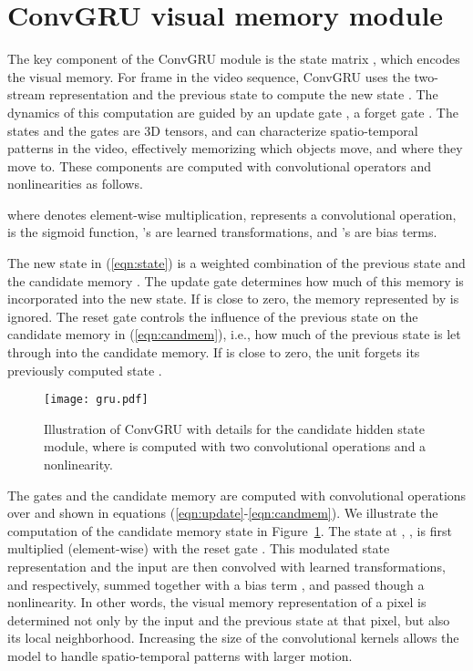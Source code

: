 \section{ConvGRU visual memory module}
\label{sec:recurrent}
The key component of the ConvGRU module is the state matrix , which encodes
the visual memory. For frame  in the video sequence, ConvGRU uses the
two-stream representation  and the previous state  to compute the
new state . The dynamics of this computation are guided by an update gate
, a forget gate .
The states and the gates are 3D tensors, and can characterize spatio-temporal
patterns in the video, effectively memorizing which objects move, and where
they move to. These components are computed with convolutional operators and
nonlinearities as follows.

where  denotes element-wise multiplication,  represents a
convolutional operation,  is the sigmoid function, 's are learned
transformations, and 's are bias terms.

The new state  in (\ref{eqn:state}) is a weighted combination of the
previous state  and the candidate memory . The update
gate  determines how much of this memory is incorporated into the new
state. If  is close to zero, the memory represented by  is
ignored. The reset gate  controls the influence of the previous state
 on the candidate memory  in (\ref{eqn:candmem}), i.e.,
how much of the previous state is let through into the candidate memory. If
 is close to zero, the unit forgets its previously computed state
.
\begin{figure}[t]
\begin{center}
\texttt{[image: gru.pdf]}
\end{center}
\vspace{-0.3cm}
\caption{Illustration of ConvGRU with details for the candidate hidden state
module, where   is computed with two convolutional operations and
a  nonlinearity.}
\label{fig:lstm}
\end{figure}

The gates and the candidate memory are computed with convolutional operations
over  and  shown in equations
(\ref{eqn:update}-\ref{eqn:candmem}). We illustrate the computation of the
candidate memory state  in Figure~\ref{fig:lstm}.  The state at
, , is first multiplied (element-wise) with the reset gate .
This modulated state representation and the input  are then convolved with
learned transformations,  and  respectively,
summed together with a bias term , and passed though a 
nonlinearity. In other words, the visual memory representation of a pixel is
determined not only by the input and the previous state at that pixel, but also
its local neighborhood. Increasing the size of the convolutional kernels allows
the model to handle spatio-temporal patterns with larger motion.

